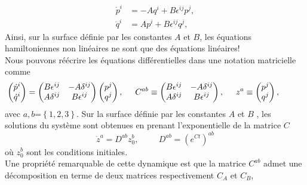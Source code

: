 \documentclass[12pt,a4paper, openany]{report}
\begin{document}
	\begin{equation}
		\left.\begin{aligned}
			\dot{p}^i&=-Aq^i+B\epsilon^{ij}p^j,\\
			\dot{q}^i&=Ap^i+B\epsilon^{ij}q^j,
		\end{aligned}\right.
	\end{equation} 
	Ainsi, sur la surface définie par les constantes $A $ et $ B$, les équations hamiltoniennes non linéaires ne sont que des équations linéaires!\\ Nous pouvons réécrire les équations différentielles dans une notation matricielle comme
	\begin{equation}
		\hspace{-1cm}
		\begin{pmatrix}
			\dot{p}^i \\
			\dot{q}^i
		\end{pmatrix}
		=
		\begin{pmatrix}
			B\epsilon^{ij} & -A\delta^{ij}\\
			A\delta^{ij} & B\epsilon^{ij}
		\end{pmatrix}
		\begin{pmatrix}
			{p}^j \\
			{q}^j
		\end{pmatrix} ,\hspace{0.5cm}
		C^{ab}\equiv
		\begin{pmatrix}
			B\epsilon^{ij} & -A\delta^{ij}\\
			A\delta^{ij} & B\epsilon^{ij}
		\end{pmatrix} ,\hspace{0.5cm}
		z^a\equiv
		\begin{pmatrix}
			{p}^j \\
			{q}^j
		\end{pmatrix},
	\end{equation} 
	avec $a,b$=$\left\{1,2,3\right\}$. Sur la surface définie par les constantes $A$ et $B$ , les solutions du système sont obtenues en prenant l'exponentielle de la matrice $C$
	\begin{equation}
		\dot{z}^a=D^{ab}z_0^b ,\hspace{1cm} D^{ab}=\left(e^{Ct}\right)^{ab}
	\end{equation}
	où $z_0^b $ sont les conditions initiales.\\ Une propriété remarquable de cette dynamique est que la matrice $C^{ab}$ admet une décomposition en terme de deux matrices respectivement $C_A$ et $C_B$,
\end{document}
